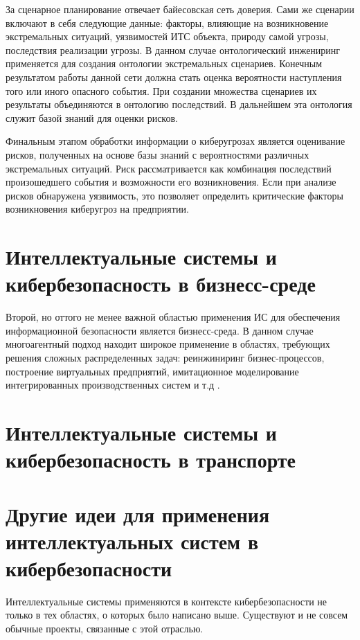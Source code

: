 За сценарное планирование отвечает байесовская сеть доверия. Сами же сценарии включают в себя следующие данные:
факторы, влияющие на возникновение экстремальных ситуаций, уязвимостей ИТС объекта, природу самой угрозы,
последствия реализации угрозы. В данном случае онтологический инжениринг применяется для создания онтологии
экстремальных сценариев. Конечным результатом работы данной сети должна стать оценка вероятности наступления
того или иного опасного события. При создании множества сценариев их результаты объединяются в онтологию
последствий. В дальнейшем эта онтология служит базой знаний для оценки рисков.

Финальным этапом обработки информации о киберугрозах является оценивание рисков, полученных на основе базы
знаний с вероятностями различных экстремальных ситуаций. Риск рассматривается как комбинация последствий
произошедшего события и возможности его возникновения. Если при анализе рисков обнаружена уязвимость, это
позволяет определить критические факторы возникновения киберугроз на предприятии.

\section{Интеллектуальные системы и кибербезопасность в бизнесс-среде}
Второй, но оттого не менее важной областью применения ИС для обеспечения информационной безопасности
является бизнесс-среда. В данном случае многоагентный подход находит широкое применение в
областях, требующих решения сложных распределенных задач: реинжиниринг бизнес-процессов,
построение виртуальных предприятий, имитационное моделирование интегрированных производственных систем
и т.д \cite{mob}.


\section{Интеллектуальные системы и кибербезопасность в транспорте}
\newpage

\section{Другие идеи для применения интеллектуальных систем в кибербезопасности}
Интеллектуальные системы применяются в контексте кибербезопасности не только в тех областях, о которых было
написано выше. Существуют и не совсем обычные проекты, связанные с этой отраслью.

